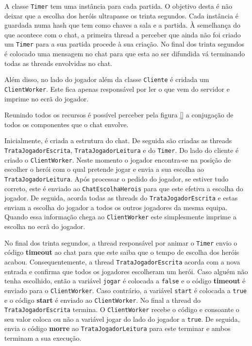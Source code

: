 \documentclass[a4paper]{article}
\begin{document}
A classe \texttt{Timer} tem uma instância para cada partida. O objetivo desta é não deixar que a escolha dos heróis ultrapasse os trinta segundos. Cada instância é guardada numa hash que tem como chaves a sala e a partida. À semelhança do que acontece com o chat, a primeira thread a perceber que ainda não foi criado um \texttt{Timer} para a sua partida procede à sua criação. No final dos trinta segundos é colocado uma mensagem no chat para que esta ao ser difundida vá terminando todas as threads envolvidas no chat.

Além disso, no lado do jogador além da classe \texttt{Cliente} é cridada um \texttt{ClientWorker}. Este fica apenas responsável por ler o que vem do servidor e imprime no ecrã do jogador.

Reunindo todos os recursos é possível perceber pela figura \ref{} a conjugação de todos os componentes que o chat envolve. 

Inicialmente, é criada a estrutura do chat. De seguida são criadas as threads \texttt{TrataJogadorEscrita}, \texttt{TrataJogadorLeitura} e do \texttt{Timer}. Do lado do cliente é criado o \texttt{ClientWorker}. Neste momento o jogador encontra-se na posição de escolher o herói com o qual pretende jogar e envia a sua escolha ao \texttt{TrataJogadorLeitura}. Após processar o pedido do jogador, se estiver tudo correto, este é enviado ao \texttt{ChatEscolhaHerois} para que este efetiva a escolha do jogador. De seguida, acorda todas as threads do \texttt{TrataJogadorEscrita} e estas enviam a escolha do jogador a todos os outros jogadores da mesma equipa. Quando essa informação chega ao \texttt{ClientWorker} este simplesmente imprime a escolha no ecrã do jogador.

No final dos trinta segundos, a thread responsável por animar o \texttt{Timer} envio o código \textbf{timeout} ao chat para que este saiba que o tempo de escolha dos heróis acabou. Consequentemente, a thread \texttt{TrataJogadorEscrita} acorda com a nova entrada e confirma que todos os jogadores escolheram um herói. Caso alguém não tenha escolhido, então a variável \texttt{jogar} é colocada a \texttt{false} e o código \textbf{timeout} é enviado para o \texttt{ClientWorker}. Caso contrário, a variável \texttt{start} é colocada a \texttt{true} e o código \textbf{start} é enviado ao \texttt{ClientWorker}. No final a thread do \texttt{TrataJogadorEscrita} termina. O \texttt{ClientWorker} recebe o código e consoante o seu valor coloca ou não a variável jogar do lado do jogador a \texttt{true}. De seguida, envia o código \textbf{morre} ao \texttt{TrataJogadorLeitura} para este terminar e ambos terminam a sua execução.
\end{document}
